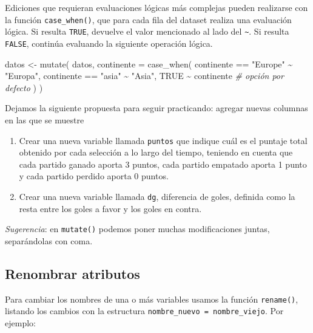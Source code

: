 \documentclass[
]{book}
\newenvironment{Shaded}{\begin{snugshade}}{\end{snugshade}}
\newcommand{\AttributeTok}[1]{\textcolor[rgb]{0.77,0.63,0.00}{#1}}
\newcommand{\CommentTok}[1]{\textcolor[rgb]{0.56,0.35,0.01}{\textit{#1}}}
\newcommand{\ConstantTok}[1]{\textcolor[rgb]{0.00,0.00,0.00}{#1}}
\newcommand{\FunctionTok}[1]{\textcolor[rgb]{0.00,0.00,0.00}{#1}}
\newcommand{\NormalTok}[1]{#1}
\newcommand{\OtherTok}[1]{\textcolor[rgb]{0.56,0.35,0.01}{#1}}
\newcommand{\SpecialCharTok}[1]{\textcolor[rgb]{0.00,0.00,0.00}{#1}}
\newcommand{\StringTok}[1]{\textcolor[rgb]{0.31,0.60,0.02}{#1}}
\begin{document}
Ediciones que requieran evaluaciones lógicas más complejas pueden realizarse con la función \texttt{case\_when()}, que para cada fila del dataset realiza una evaluación lógica. Si resulta \texttt{TRUE}, devuelve el valor mencionado al lado del \texttt{\textasciitilde{}}. Si resulta \texttt{FALSE}, continúa evaluando la siguiente operación lógica.

\begin{Shaded}
\begin{Highlighting}[]
\NormalTok{datos }\OtherTok{\textless{}{-}} \FunctionTok{mutate}\NormalTok{(}
\NormalTok{    datos, }
    \AttributeTok{continente =} \FunctionTok{case\_when}\NormalTok{(}
\NormalTok{        continente }\SpecialCharTok{==} \StringTok{"Europe"} \SpecialCharTok{\textasciitilde{}} \StringTok{"Europa"}\NormalTok{,}
\NormalTok{        continente }\SpecialCharTok{==} \StringTok{"asia"} \SpecialCharTok{\textasciitilde{}} \StringTok{"Asia"}\NormalTok{,}
        \ConstantTok{TRUE} \SpecialCharTok{\textasciitilde{}}\NormalTok{ continente }\CommentTok{\# opción por defecto}
\NormalTok{        )}
\NormalTok{    )}
\end{Highlighting}
\end{Shaded}

Dejamos la siguiente propuesta para seguir practicando: agregar nuevas columnas en las que se muestre

\begin{enumerate}
\def\labelenumi{\alph{enumi})}
\item
  Crear una nueva variable llamada \texttt{puntos} que indique cuál es el puntaje total obtenido por cada selección a lo largo del tiempo, teniendo en cuenta que cada partido ganado aporta 3 puntos, cada partido empatado aporta 1 punto y cada partido perdido aporta 0 puntos.
\item
  Crear una nueva variable llamada \texttt{dg}, diferencia de goles, definida como la resta entre los goles a favor y los goles en contra.
\end{enumerate}

\emph{Sugerencia}: en \texttt{mutate()} podemos poner muchas modificaciones juntas, separándolas con coma.

\hypertarget{renombrar-atributos}{%
\subsection{Renombrar atributos}\label{renombrar-atributos}}

Para cambiar los nombres de una o más variables usamos la función \texttt{rename()}, listando los cambios con la estructura \texttt{nombre\_nuevo\ =\ nombre\_viejo}. Por ejemplo:
\end{document}
